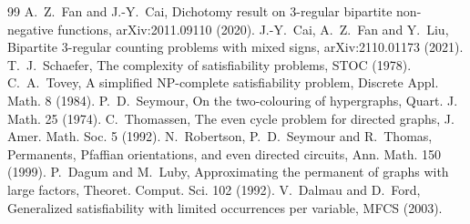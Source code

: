 \documentclass[11pt]{article}
\theoremstyle{definition}
\begin{document}
\begin{thebibliography}{99}
 A.~Z.~Fan and J.-Y.~Cai, Dichotomy result on 3-regular bipartite non-negative functions, arXiv:2011.09110 (2020).
 J.-Y.~Cai, A.~Z.~Fan and Y.~Liu, Bipartite 3-regular counting problems with mixed signs, arXiv:2110.01173 (2021).
 T.~J.~Schaefer, The complexity of satisfiability problems, STOC (1978).
 C.~A.~Tovey, A simplified NP-complete satisfiability problem, Discrete Appl. Math. 8 (1984).
 P.~D.~Seymour, On the two-colouring of hypergraphs, Quart. J. Math. 25 (1974).
 C.~Thomassen, The even cycle problem for directed graphs, J. Amer. Math. Soc. 5 (1992).
 N.~Robertson, P.~D.~Seymour and R.~Thomas, Permanents, Pfaffian orientations, and even directed circuits, Ann. Math. 150 (1999).
 P.~Dagum and M.~Luby, Approximating the permanent of graphs with large factors, Theoret. Comput. Sci. 102 (1992).
 V.~Dalmau and D.~Ford, Generalized satisfiability with limited occurrences per variable, MFCS (2003).
\end{thebibliography}
\end{document}
